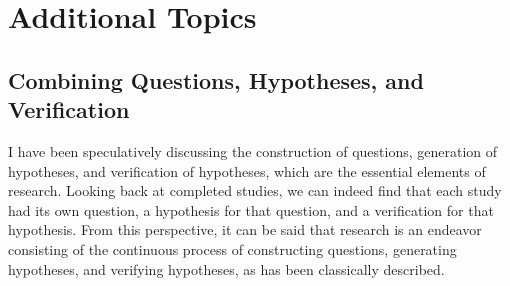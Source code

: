 


\section{Additional Topics}

\subsection{Combining Questions, Hypotheses, and Verification}
I have been speculatively discussing the construction of questions, generation of hypotheses, and verification of hypotheses, which are the essential elements of research. Looking back at completed studies, we can indeed find that each study had its own question, a hypothesis for that question, and a verification for that hypothesis. From this perspective, it can be said that research is an endeavor consisting of the continuous process of constructing questions, generating hypotheses, and verifying hypotheses, as has been classically described.

